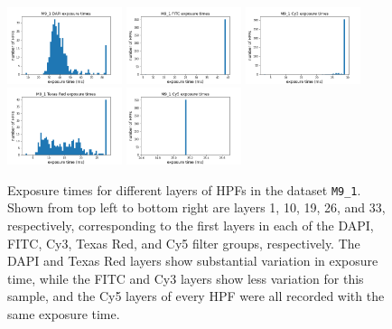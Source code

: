 \documentclass[letterpaper,11pt]{article}
\begin{document}
\begin{figure}[!ht]
\centering
\includegraphics[width=0.3\textwidth]{images/introduction/exposure_times_M9_1_layer_1}
\includegraphics[width=0.3\textwidth]{images/introduction/exposure_times_M9_1_layer_10}
\includegraphics[width=0.3\textwidth]{images/introduction/exposure_times_M9_1_layer_19}
\includegraphics[width=0.3\textwidth]{images/introduction/exposure_times_M9_1_layer_26}
\includegraphics[width=0.3\textwidth]{images/introduction/exposure_times_M9_1_layer_33}
\caption{\footnotesize Exposure times for different layers of HPFs in the dataset \texttt{M9\_1}. Shown from top left to bottom right are layers 1, 10, 19, 26, and 33, respectively, corresponding to the first layers in each of the DAPI, FITC, Cy3, Texas Red, and Cy5 filter groups, respectively. The DAPI and Texas Red layers show substantial variation in exposure time, while the FITC and Cy3 layers show less variation for this sample, and the Cy5 layers of every HPF were all recorded with the same exposure time.}
\label{fig:exposure_time_variation_M9_1}
\end{figure}
\end{document}
